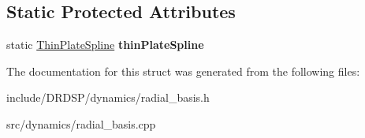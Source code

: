 \subsection*{Static Protected Attributes}
\begin{DoxyCompactItemize}
\item 
\hypertarget{struct_d_r_d_s_p_1_1_radial_function_a3127a8f8bc519d3844e1411585d52f29}{static \hyperlink{struct_d_r_d_s_p_1_1_thin_plate_spline}{Thin\-Plate\-Spline} {\bfseries thin\-Plate\-Spline}}\label{struct_d_r_d_s_p_1_1_radial_function_a3127a8f8bc519d3844e1411585d52f29}

\end{DoxyCompactItemize}


The documentation for this struct was generated from the following files\-:\begin{DoxyCompactItemize}
\item 
include/\-D\-R\-D\-S\-P/dynamics/radial\-\_\-basis.\-h\item 
src/dynamics/radial\-\_\-basis.\-cpp\end{DoxyCompactItemize}
